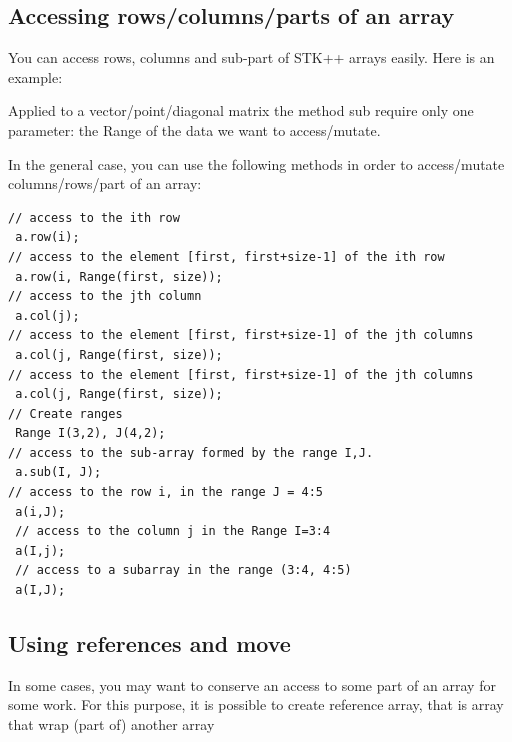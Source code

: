 \documentclass[a4paper,10pt]{article}
\begin{document}
\subsection{Accessing rows/columns/parts of an array}

You can access rows, columns and sub-part of STK++ arrays easily. Here is an example:

\begin{minipage}[t]{0.66\textwidth}

\end{minipage}
\hspace{0.2cm}
\begin{minipage}[t]{0.33\textwidth}
\addtocounter{lstlisting}{-1}

\end{minipage}

Applied to a vector/point/diagonal matrix the method sub require only
one parameter: the Range of the data we want to access/mutate.

In the general case, you can use the following methods in order to access/mutate
columns/rows/part of an array:
\begin{lstlisting}[style=customcpp,caption=Review of the main accessors]
// access to the ith row
 a.row(i);
// access to the element [first, first+size-1] of the ith row
 a.row(i, Range(first, size));
// access to the jth column
 a.col(j);
// access to the element [first, first+size-1] of the jth columns
 a.col(j, Range(first, size));
// access to the element [first, first+size-1] of the jth columns
 a.col(j, Range(first, size));
// Create ranges
 Range I(3,2), J(4,2);
// access to the sub-array formed by the range I,J.
 a.sub(I, J);
// access to the row i, in the range J = 4:5
 a(i,J);
 // access to the column j in the Range I=3:4
 a(I,j);
 // access to a subarray in the range (3:4, 4:5)
 a(I,J);
\end{lstlisting}


\subsection{Using references and move}

In some cases, you may want to conserve an access to some part of an array
for some work. For this purpose, it is possible to create reference
array, that is array that wrap (part of) another array

\begin{minipage}[t]{0.66\textwidth}

\end{minipage}
\hspace{0.2cm}
\begin{minipage}[t]{0.33\textwidth}
\addtocounter{lstlisting}{-1}

\end{minipage}
\end{document}
